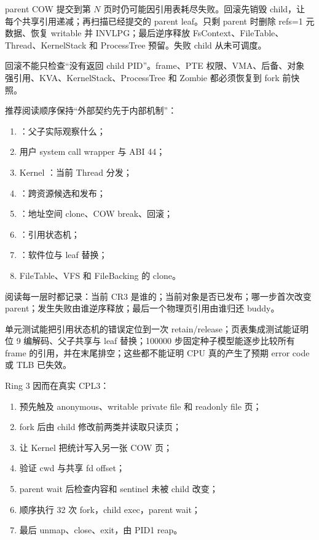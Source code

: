 \begin{failurebox}
parent COW 提交到第 $N$ 页时仍可能因引用表耗尽失败。回滚先销毁 child，让
每个共享引用递减；再扫描已经提交的 parent leaf。只剩 parent 时删除 refs=1
元数据、恢复 writable 并 INVLPG；最后逆序释放 FsContext、FileTable、
Thread、KernelStack 和 ProcessTree 预留。失败 child 从未可调度。
\end{failurebox}

回滚不能只检查“没有返回 child PID”。frame、PTE 权限、VMA、后备、对象
强引用、KVA、KernelStack、ProcessTree 和 Zombie 都必须恢复到 fork 前快照。

推荐阅读顺序保持“外部契约先于内部机制”：

\begin{enumerate}[label=\arabic*.]
  \item {}：父子实际观察什么；
  \item 用户 system call wrapper 与 ABI 44；
  \item Kernel ：当前 Thread 分发；
  \item {}：跨资源候选和发布；
  \item {}：地址空间 clone、COW break、回滚；
  \item {}：引用状态机；
  \item {}：软件位与 leaf 替换；
  \item FileTable、VFS 和 FileBacking 的 clone。
\end{enumerate}

阅读每一层时都记录：当前 CR3 是谁的；当前对象是否已发布；哪一步首次改变
parent；发生失败由谁逆序释放；最后一个物理页引用由谁归还 buddy。

单元测试能把引用状态机的错误定位到一次 retain/release；页表集成测试能证明
位 9 编解码、父子共享与 leaf 替换；100000 步固定种子模型能逐步比较所有
frame 的引用，并在末尾排空；这些都不能证明 CPU 真的产生了预期 error code
或 TLB 已失效。

Ring 3  因而在真实 CPL3：

\begin{enumerate}[label=\arabic*.]
  \item 预先触及 anonymous、writable private file 和 readonly file 页；
  \item fork 后由 child 修改前两类并读取只读页；
  \item 让 Kernel 把统计写入另一张 COW 页；
  \item 验证 cwd 与共享 fd offset；
  \item parent wait 后检查内容和 sentinel 未被 child 改变；
  \item 顺序执行 32 次 fork，child exec，parent wait；
  \item 最后 unmap、close、exit，由 PID1 reap。
\end{enumerate}

